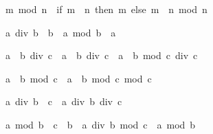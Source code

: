 \begin{isabellebody}
\isamarkupfalse%
%
\endisatagproof
{\isafoldproof}%
%
\isadelimproof
%
\endisadelimproof
%
\begin{isamarkuptext}%
\begin{isabelle}%
m\ mod\ n\ {}\ {}if\ m\ {}\ n\ then\ m\ else\ {}m\ {}\ n{}\ mod\ n{}%
\end{isabelle}

\begin{isabelle}%
a\ div\ b\ {}\ b\ {}\ a\ mod\ b\ {}\ a%
\end{isabelle}


\begin{isabelle}%
a\ {}\ b\ div\ c\ {}\ a\ {}\ {}b\ div\ c{}\ {}\ a\ {}\ {}b\ mod\ c{}\ div\ c%
\end{isabelle}

\begin{isabelle}%
a\ {}\ b\ mod\ c\ {}\ a\ {}\ {}b\ mod\ c{}\ mod\ c%
\end{isabelle}

\begin{isabelle}%
a\ div\ {}b\ {}\ c{}\ {}\ a\ div\ b\ div\ c%
\end{isabelle}

\begin{isabelle}%
a\ mod\ {}b\ {}\ c{}\ {}\ b\ {}\ {}a\ div\ b\ mod\ c{}\ {}\ a\ mod\ b%
\end{isabelle}


\end{isamarkuptext}
\end{isabellebody}
